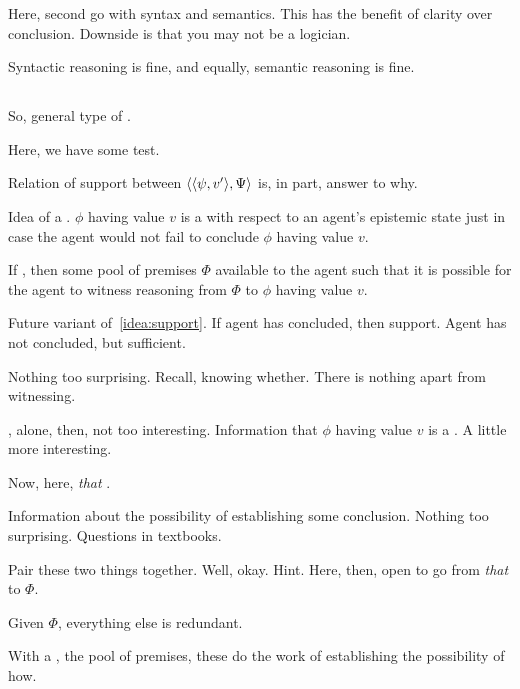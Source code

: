 \begin{note}
  Here, second go with syntax and semantics.
  This has the benefit of clarity over conclusion.
  Downside is that you may not be a logician.

  Syntactic reasoning is fine, and equally, semantic reasoning is fine.
\end{note}


\subsection{}
\label{sec:fc3}

\begin{note}
  So, general type of .

  Here, we have some test.

  Relation of support between \(\langle \langle \psi, v' \rangle, \Psi \rangle\) is, in part, answer to why.
\end{note}



\begin{note}[Outline]
  Idea of a .
  \(\phi\) having value \(v\) is a  with respect to an agent's epistemic state just in case the agent would not fail to conclude \(\phi\) having value \(v\).

  If , then some pool of premises \(\Phi\) available to the agent such that it is possible for the agent to witness reasoning from \(\Phi\) to \(\phi\) having value \(v\).

  Future variant of~\autoref{idea:support}.
  If agent has concluded, then support.
  Agent has not concluded, but sufficient.

  Nothing too surprising.
  Recall, knowing whether.
  There is nothing apart from witnessing.

  , alone, then, not too interesting.
  Information that \(\phi\) having value \(v\) is a .
  A little more interesting.

  Now, here, \emph{that} .

  Information about the possibility of establishing some conclusion.
  Nothing too surprising.
  Questions in textbooks.

  Pair these two things together.
  Well, okay.
  Hint.
  Here, then, open to go from \emph{that}  to \(\Phi\).

  Given \(\Phi\), everything else is redundant.

  With a , the pool of premises, these do the work of establishing the possibility of how.

\end{note}


